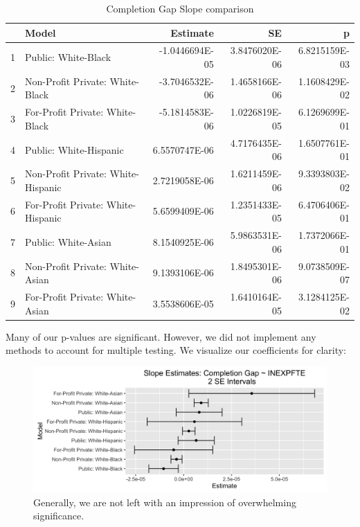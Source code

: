 \documentclass{article}
\begin{document}
\begin{table}[ht]
\centering
\caption{Completion Gap Slope comparison} 
\begin{tabular}{rlrrr}
  \hline
 & Model & Estimate & SE & p \\ 
  \hline
1 & Public: White-Black & -1.0446694E-05 & 3.8476020E-06 & 6.8215159E-03 \\ 
  2 & Non-Profit Private: White-Black & -3.7046532E-06 & 1.4658166E-06 & 1.1608429E-02 \\ 
  3 & For-Profit Private: White-Black & -5.1814583E-06 & 1.0226819E-05 & 6.1269699E-01 \\ 
  4 & Public: White-Hispanic & 6.5570747E-06 & 4.7176435E-06 & 1.6507761E-01 \\ 
  5 & Non-Profit Private: White-Hispanic & 2.7219058E-06 & 1.6211459E-06 & 9.3393803E-02 \\ 
  6 & For-Profit Private: White-Hispanic & 5.6599409E-06 & 1.2351433E-05 & 6.4706406E-01 \\ 
  7 & Public: White-Asian & 8.1540925E-06 & 5.9863531E-06 & 1.7372066E-01 \\ 
  8 & Non-Profit Private: White-Asian & 9.1393106E-06 & 1.8495301E-06 & 9.0738509E-07 \\ 
  9 & For-Profit Private: White-Asian & 3.5538606E-05 & 1.6410164E-05 & 3.1284125E-02 \\ 
   \hline
\end{tabular}
\end{table}
Many of our p-values are significant. However, we did not implement any methods to account for multiple testing. We visualize our coefficients for clarity:

\begin{figure}[H]
\centering
\includegraphics[width=1\textwidth]{../images/completion_gaps_results.png}
\caption{\label{fig: completion_gaps_plot} Generally, we are not left with an impression of overwhelming significance.}
\end{figure}
\end{document}
